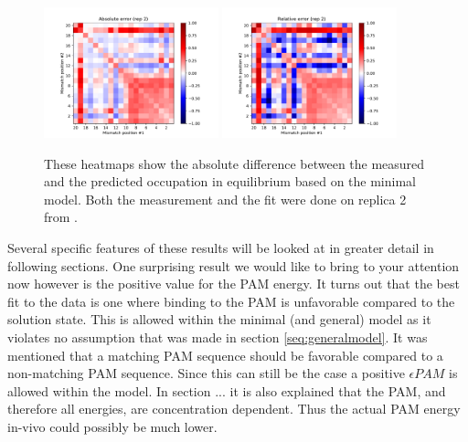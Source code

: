 \begin{figure}
\begin{center}
\includegraphics[width=0.45\textwidth]{images/MinModelRep2AbsErr}
\includegraphics[width=0.45\textwidth]{images/MinModelRep2RelErr}
\caption{These heatmaps show the absolute difference between the measured and the predicted occupation in equilibrium based on the minimal model. Both the measurement and the fit were done on replica 2 from \cite{PNAS}.}
\label{fig:MinModelRep2ErrorsHM}
\end{center}
\end{figure}


Several specific features of these results will be looked at in greater detail in following sections. One surprising result we would like to bring to your attention now however is the positive value for the PAM energy. It turns out that the best fit to the data is one where binding to the PAM is unfavorable compared to the solution state. This is allowed within the minimal (and general) model as it violates no assumption that was made in section \ref{seq:generalmodel}. It was mentioned that a matching PAM sequence should be favorable compared to a non-matching PAM sequence. Since this can still be the case a positive $\epsilon PAM$ is allowed within the model. In section ... %
it is also explained that the PAM, and therefore all energies, are concentration dependent. Thus the actual PAM energy in-vivo could possibly be much lower. %


